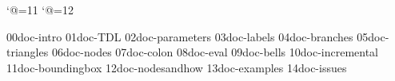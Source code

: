 









\sstitles


\catcode`@=11
\let\ling@getpars=\@getoptionalarg
\let\pst@pars=\@optionalarg
\catcode`@=12

\get 00doc-intro
\get 01doc-TDL
\get 02doc-parameters
\get 03doc-labels
\get 04doc-branches
\get 05doc-triangles
\get 06doc-nodes
\get 07doc-colon
\get 08doc-eval
\get 09doc-bells
\get 10doc-incremental
\get 11doc-boundingbox
\get 12doc-nodesandhow
\get 13doc-examples
\get 14doc-issues
%
%
%


\bye


